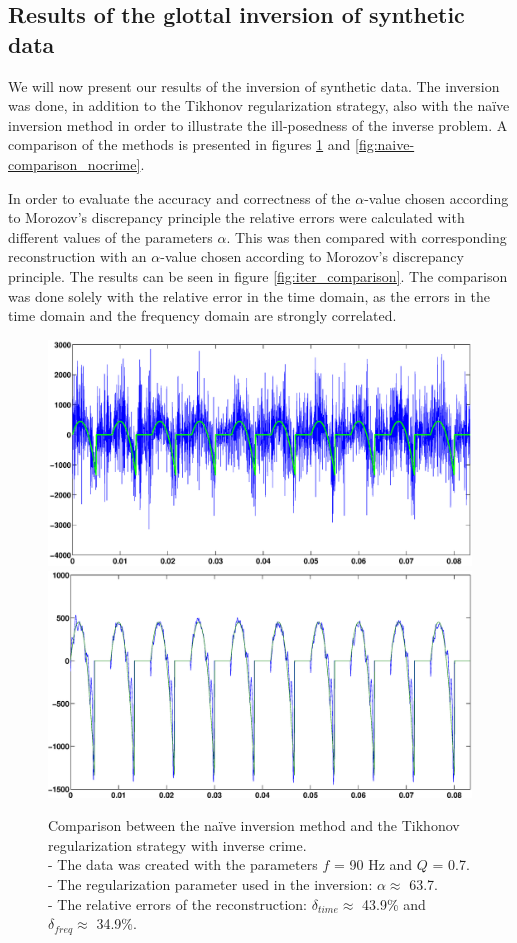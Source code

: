 \documentclass[12pt,a4]{article}
\newcommand{\inversionresult}[5]{\\
 - The data was created with the parameters $f$ = #1 Hz and $Q$ = #2.\\
 - The regularization parameter used in the inversion: $\alpha \approx$ #3.\\
 - The relative errors of the reconstruction: $\delta_{time} \approx$ #4\% and $\delta_{freq} \approx$ #5\%.}
\begin{document}
\subsection{Results of the glottal inversion of synthetic data}
We will now present our results of the inversion of synthetic data. The inversion was done, in addition to the Tikhonov regularization strategy, also with the naïve inversion method in order to illustrate the ill-posedness of the inverse problem.
A comparison of the methods is presented in figures \ref{fig:naive-comparison_crime} and \ref{fig:naive-comparison_nocrime}.

In order to evaluate the accuracy and correctness of the $\alpha$-value chosen according to Morozov's discrepancy principle the relative errors were calculated with different values of the parameters $\alpha$. This was then compared with corresponding reconstruction with an $\alpha$-value chosen according to Morozov's discrepancy principle. The results can be seen in figure \ref{fig:iter_comparison}. The comparison was done solely with the relative error in the time domain, as the errors in the time domain and the frequency domain are strongly correlated.

\begin{figure}[H]
\begin{center}
\includegraphics[scale=.3]{img/naive_test_naive.eps}
\includegraphics[scale=.3]{img/naive_test_morozov.eps}
\end{center}
\caption{Comparison between the naïve inversion method and the Tikhonov regularization strategy with inverse crime. \inversionresult{90}{0.7}{63.7}{43.9}{34.9}}
\label{fig:naive-comparison_crime}
\end{figure}
\end{document}

